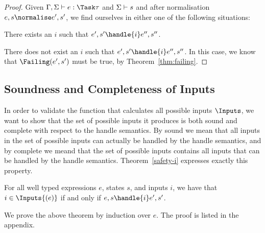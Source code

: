 \begin{proof}
  Given $\Gamma,\Sigma\infers e:\Task\tau$ and $\Sigma\vdash s$ and after
  normalisation $e,s \normalise e',s'$, we find ourselves in either one of the
  following situations:

  There exists an $i$ such that $e',s'\handle{i} e'',s''$.

  There does not exist an $i$ such that $e',s'\handle{i} e'',s''$. In this case, we
  know that $\Failing(e',s')$ must be true, by Theorem~\ref{thm:failing}.
\end{proof}



\subsection{Soundness and Completeness of Inputs}

In order to validate the function that calculates all possible inputs $\Inputs$,
we want to show that the set of possible inputs it produces is both sound and
complete with respect to the handle semantics. By sound we mean that all inputs
in the set of possible inputs can actually be handled by the handle semantics,
and by complete we meand that the set of possible inputs contains all inputs
that can be handled by the handle semantics. Theorem~\ref{safety-i} expresses
exactly this property.

\begin{theorem}
  For all well typed expressions $e$, states $s$, and inputs $i$,
  we have that $i \in \Inputs{(e)}$ if and only if $e,s \handle{i} e',s'$.
  \label{thm:safety-i}
\end{theorem}

We prove the above theorem by induction over $e$. The proof is listed in the
appendix.
